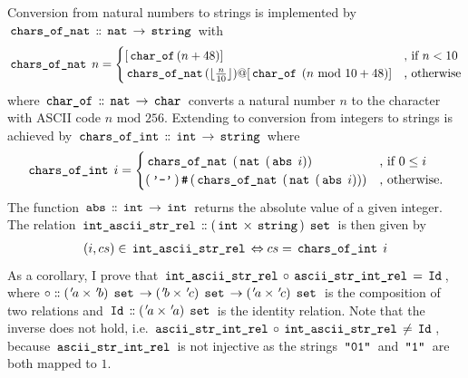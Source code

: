 Conversion from natural numbers to strings is implemented by $\,\text{\ttfamily chars\_of\_nat}\, \mathrel{\mathord{:}\mkern-1.2mu\mathord{:}} \,\text{\ttfamily nat}\, \rightarrow \,\text{\ttfamily string}\,$ with
\begin{gather*}
	\,\text{\ttfamily chars\_of\_nat}\, \; n =
	\begin{cases}
		[\,\text{\ttfamily char\_of}\, (n + 48)]                                                                                                    & \text{, if $n<10$} \\
		\,\text{\ttfamily chars\_of\_nat}\, (\lfloor \frac{n}{10} \rfloor) @ [\,\text{\ttfamily char\_of}\, \; (n \text{ mod } 10 + 48)] & \text{, otherwise}
	\end{cases}
\end{gather*}
where $\,\text{\ttfamily char\_of}\, \mathrel{\mathord{:}\mkern-1.2mu\mathord{:}} \,\text{\ttfamily nat}\, \rightarrow \,\text{\ttfamily char}\,$ converts a natural number $n$ to the character with ASCII code $n \text{ mod } 256$.
Extending to conversion from integers to strings is achieved by $\,\text{\ttfamily chars\_of\_int}\, \mathrel{\mathord{:}\mkern-1.2mu\mathord{:}} \,\text{\ttfamily int}\, \rightarrow \,\text{\ttfamily string}\,$ where
\begin{gather*}
	\,\text{\ttfamily chars\_of\_int}\, \; i =
	\begin{cases}
		\,\text{\ttfamily chars\_of\_nat}\, \; (\,\text{\ttfamily nat}\, \; (\,\text{\ttfamily abs}\, \; i))                          & \text{, if $0 \leq i$} \\
		(\,\text{\ttfamily '-'}\,) \,\text{\ttfamily \#}\, (\,\text{\ttfamily chars\_of\_nat}\, \; (\,\text{\ttfamily nat}\, \; (\,\text{\ttfamily abs}\, \; i))) & \text{, otherwise.}
	\end{cases}
\end{gather*}
The function $\,\text{\ttfamily abs}\, \mathrel{\mathord{:}\mkern-1.2mu\mathord{:}} \,\text{\ttfamily int}\, \rightarrow \,\text{\ttfamily int}\,$ returns the absolute value of a given integer.
The relation $\,\text{\ttfamily int\_ascii\_str\_rel}\, \mathrel{\mathord{:}\mkern-1.2mu\mathord{:}} (\,\text{\ttfamily int}\, \times \,\text{\ttfamily string}\,) \; \,\text{\ttfamily set}\,$ is then given by
\begin{gather*}
	(i,cs) \in \,\text{\ttfamily int\_ascii\_str\_rel}\, \Leftrightarrow cs = \,\text{\ttfamily chars\_of\_int}\, \; i
\end{gather*}
As a corollary, I prove that $\,\text{\ttfamily int\_ascii\_str\_rel}\, \circ \,\text{\ttfamily ascii\_str\_int\_rel}\, = \,\text{\ttfamily Id}\,$, where $\circ \mathrel{\mathord{:}\mkern-1.2mu\mathord{:}} ({\mskip2mu '\mskip-2mua} \times {\mskip2mu '\mskip-2mub}) \; \,\text{\ttfamily set}\, \rightarrow ({\mskip2mu '\mskip-2mub} \times {\mskip2mu '\mskip-2muc}) \; \,\text{\ttfamily set}\, \rightarrow ({\mskip2mu '\mskip-2mua} \times {\mskip2mu '\mskip-2muc}) \; \,\text{\ttfamily set}\,$ is the composition of two relations and $\,\text{\ttfamily Id}\, \mathrel{\mathord{:}\mkern-1.2mu\mathord{:}} ({\mskip2mu '\mskip-2mua} \times {\mskip2mu '\mskip-2mua}) \; \,\text{\ttfamily set}\,$ is the identity relation.
Note that the inverse does not hold, i.e. $\,\text{\ttfamily ascii\_str\_int\_rel}\, \circ \,\text{\ttfamily int\_ascii\_str\_rel}\, \neq \,\text{\ttfamily Id}\,$, because $\,\text{\ttfamily ascii\_str\_int\_rel}\,$ is not injective as the strings $\,\text{\ttfamily "01"}\,$ and $\,\text{\ttfamily "1"}\,$ are both mapped to $1$.

